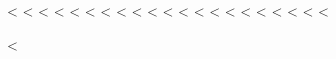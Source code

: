 <%
<%
<%
<%
<%
<%
<%
<%
<%
<%
<%
<%
<%
<%
<%
<%
<%
<%
\fi
<%
<%
<%


\usepackage{chngcntr}
<%

\lstloadlanguages{%
}
